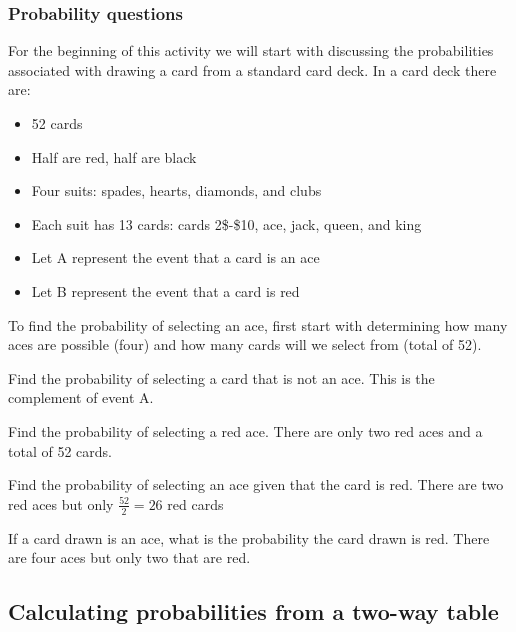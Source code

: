 \documentclass[
]{report}
\begin{document}
\subsubsection{Probability questions}\label{probability-questions}

For the beginning of this activity we will start with discussing the probabilities associated with drawing a card from a standard card deck. In a card deck there are:

\begin{itemize}
\item
  52 cards
\item
  Half are red, half are black
\item
  Four suits: spades, hearts, diamonds, and clubs
\item
  Each suit has 13 cards: cards 2\$-\$10, ace, jack, queen, and king
\item
  Let A represent the event that a card is an ace
\item
  Let B represent the event that a card is red
\end{itemize}

To find the probability of selecting an ace, first start with determining how many aces are possible (four) and how many cards will we select from (total of 52).

\vspace{1in}

Find the probability of selecting a card that is not an ace. This is the complement of event A.

\vspace{1in}

Find the probability of selecting a red ace. There are only two red aces and a total of 52 cards.

\vspace{1in}

Find the probability of selecting an ace given that the card is red. There are two red aces but only \(\frac{52}{2} = 26\) red cards

\vspace{1in}

If a card drawn is an ace, what is the probability the card drawn is red. There are four aces but only two that are red.

\vspace{1in}

\subsection{Calculating probabilities from a two-way table}\label{calculating-probabilities-from-a-two-way-table}
\end{document}

